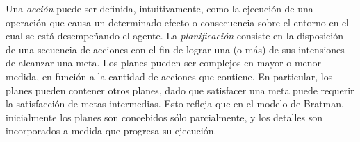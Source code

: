 Una \textit{acción} puede ser definida, intuitivamente, como la ejecución de
una operación que causa un determinado efecto o consecuencia sobre el entorno
en el cual se está desempeñando el agente. La \textit{planificación} consiste 
en la disposición de una secuencia de acciones con el fin de lograr una (o más)
de sus intensiones de alcanzar una meta. Los planes pueden ser complejos en 
mayor o menor medida, en función a la cantidad de acciones que contiene. En 
particular, los planes pueden contener otros planes, dado que satisfacer una
meta puede requerir la satisfacción de metas intermedias. Esto refleja que en 
el modelo de Bratman, inicialmente los planes son concebidos sólo parcialmente, 
y los detalles son incorporados a medida que progresa su ejecución.


